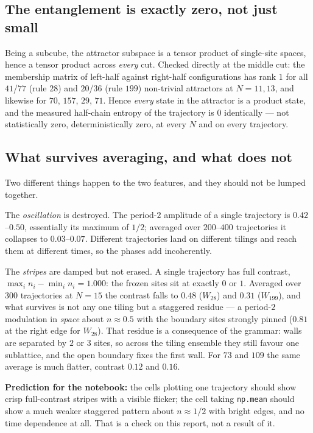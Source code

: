 \documentclass[11pt]{article}
\newcommand{\fn}[1]{\texttt{#1}}
\theoremstyle{plain}
\begin{document}
\subsection{The entanglement is exactly zero, not just small}

Being a subcube, the attractor subspace is a tensor product of single-site
spaces, hence a tensor product across \emph{every} cut. Checked directly at the
middle cut: the membership matrix of left-half against right-half configurations
has rank $1$ for all $41$/$77$ (rule $28$) and $20$/$36$ (rule $199$)
non-trivial attractors at $N=11,13$, and likewise for $70$, $157$, $29$, $71$. Hence \emph{every} state in the attractor is a product state, and the
measured half-chain entropy of the trajectory is $0$ identically --- not
statistically zero, deterministically zero, at every $N$ and on every trajectory.

\subsection{What survives averaging, and what does not}

Two different things happen to the two features, and they should not be lumped
together.

The \emph{oscillation} is destroyed. The period-$2$ amplitude of a single
trajectory is $0.42$--$0.50$, essentially its maximum of $1/2$; averaged over
$200$--$400$ trajectories it collapses to $0.03$--$0.07$. Different trajectories
land on different tilings and reach them at different times, so the phases add
incoherently.

The \emph{stripes} are damped but not erased. A single trajectory has full
contrast, $\max_i n_i - \min_i n_i = 1.000$: the frozen sites sit at exactly $0$
or $1$. Averaged over $300$ trajectories at $N=15$ the contrast falls to $0.48$
($W_{28}$) and $0.31$ ($W_{199}$), and what survives is not any one tiling but a
staggered residue --- a period-$2$ modulation in \emph{space} about $n\approx0.5$
with the boundary sites strongly pinned ($0.81$ at the right edge for $W_{28}$).
That residue is a consequence of the grammar: walls are separated by $2$ or $3$
sites, so across the tiling ensemble they still favour one sublattice, and the
open boundary fixes the first wall. For $73$ and $109$ the same average is much
flatter, contrast $0.12$ and $0.16$.

\textbf{Prediction for the notebook:} the cells plotting one trajectory should
show crisp full-contrast stripes with a visible flicker; the cell taking
\fn{np.mean} should show a much weaker staggered pattern about $n\approx1/2$ with
bright edges, and no time dependence at all. That is a check on this report, not
a result of it.
\end{document}
